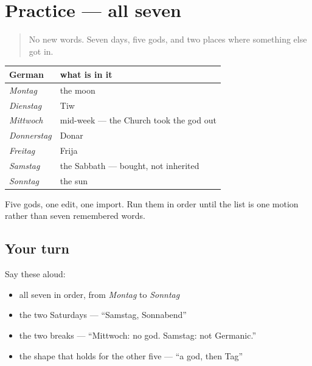 \section[Practice]{Practice — all seven}

\label{lesson:GE-C07-wochentage-2}



\begin{quote}
No new words. Seven days, five gods, and two places where something else got in.
\end{quote}

\begin{grammarlens}[title={Grammar Lens: the whole week}]
\noindent
\begin{tabularx}{\linewidth}{@{}>{\raggedright\arraybackslash}X>{\raggedright\arraybackslash}X@{}}
\toprule
\textbf{German} & \textbf{what is in it} \\
\midrule
\emph{Montag} & the moon \\
\emph{Dienstag} & Tiw \\
\emph{Mittwoch} & mid-week — the Church took the god out \\
\emph{Donnerstag} & Donar \\
\emph{Freitag} & Frija \\
\emph{Samstag} & the Sabbath — bought, not inherited \\
\emph{Sonntag} & the sun \\
\bottomrule
\end{tabularx}

Five gods, one edit, one import. Run them in order until the list is one motion rather than seven remembered words.
\end{grammarlens}

\subsection*{Your turn}
Say these aloud:

\begin{itemize}
\raggedright
  \item all seven in order, from \emph{Montag} to \emph{Sonntag}
  \item the two Saturdays — \textquotedblleft{}Samstag, Sonnabend\textquotedblright{}
  \item the two breaks — \textquotedblleft{}Mittwoch: no god. Samstag: not Germanic.\textquotedblright{}
  \item the shape that holds for the other five — \textquotedblleft{}a god, then Tag\textquotedblright{}
\end{itemize}

